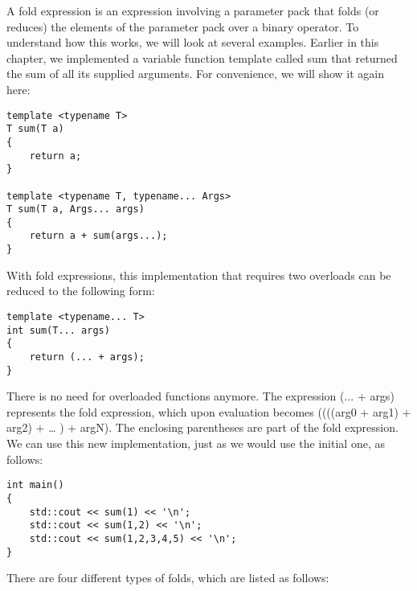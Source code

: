 A fold expression is an expression involving a parameter pack that folds (or reduces) the elements of the parameter pack over a binary operator. To understand how this works, we will look at several examples. Earlier in this chapter, we implemented a variable function template called sum that returned the sum of all its supplied arguments. For convenience, we will show it again here:

\begin{lstlisting}[style=styleCXX]
template <typename T>
T sum(T a)
{
	return a;
}

template <typename T, typename... Args>
T sum(T a, Args... args)
{
	return a + sum(args...);
}
\end{lstlisting}

With fold expressions, this implementation that requires two overloads can be reduced to the following form:

\begin{lstlisting}[style=styleCXX]
template <typename... T>
int sum(T... args)
{
	return (... + args);
}
\end{lstlisting}

There is no need for overloaded functions anymore. The expression (... + args) represents the fold expression, which upon evaluation becomes ((((arg0 + arg1) + arg2) + … ) + argN). The enclosing parentheses are part of the fold expression. We can use this new implementation, just as we would use the initial one, as follows:

\begin{lstlisting}[style=styleCXX]
int main()
{
	std::cout << sum(1) << '\n';
	std::cout << sum(1,2) << '\n';
	std::cout << sum(1,2,3,4,5) << '\n';
}
\end{lstlisting}

There are four different types of folds, which are listed as follows:

